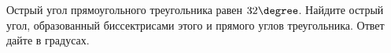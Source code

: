 \begin{ex}
	\begin{condition}
		 Острый угол прямоугольного треугольника равен \( 32\degree \). Найдите острый угол, образованный биссектрисами этого и прямого углов треугольника. Ответ дайте в градусах.
	\end{condition}
\end{ex}